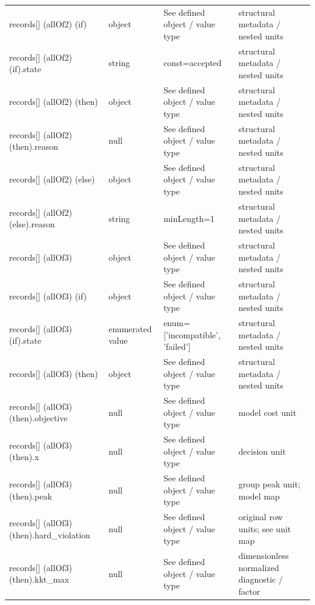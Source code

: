 \begin{longtable}{@{}>{\raggedright\arraybackslash}p{}>{\raggedright\arraybackslash}p{}>{\raggedright\arraybackslash}p{}>{\raggedright\arraybackslash}p{}@{}}
records[] (allOf2) (if) & object & See defined object /\allowbreak{} value type & structural metadata /\allowbreak{} nested units\\
records[] (allOf2) (if).\allowbreak{}state & string & const=\allowbreak{}accepted & structural metadata /\allowbreak{} nested units\\
records[] (allOf2) (then) & object & See defined object /\allowbreak{} value type & structural metadata /\allowbreak{} nested units\\
records[] (allOf2) (then).\allowbreak{}reason & null & See defined object /\allowbreak{} value type & structural metadata /\allowbreak{} nested units\\
records[] (allOf2) (else) & object & See defined object /\allowbreak{} value type & structural metadata /\allowbreak{} nested units\\
records[] (allOf2) (else).\allowbreak{}reason & string & minLength=\allowbreak{}1 & structural metadata /\allowbreak{} nested units\\
records[] (allOf3) & object & See defined object /\allowbreak{} value type & structural metadata /\allowbreak{} nested units\\
records[] (allOf3) (if) & object & See defined object /\allowbreak{} value type & structural metadata /\allowbreak{} nested units\\
records[] (allOf3) (if).\allowbreak{}state & enumerated value & enum=\allowbreak{}['incompatible', 'failed'] & structural metadata /\allowbreak{} nested units\\
records[] (allOf3) (then) & object & See defined object /\allowbreak{} value type & structural metadata /\allowbreak{} nested units\\
records[] (allOf3) (then).\allowbreak{}objective & null & See defined object /\allowbreak{} value type & model cost unit\\
records[] (allOf3) (then).\allowbreak{}x & null & See defined object /\allowbreak{} value type & decision unit\\
records[] (allOf3) (then).\allowbreak{}peak & null & See defined object /\allowbreak{} value type & group peak unit; model map\\
records[] (allOf3) (then).\allowbreak{}hard\_\allowbreak{}violation & null & See defined object /\allowbreak{} value type & original row units; see unit map\\
records[] (allOf3) (then).\allowbreak{}kkt\_\allowbreak{}max & null & See defined object /\allowbreak{} value type & dimensionless normalized diagnostic /\allowbreak{} factor\\

\end{longtable}
